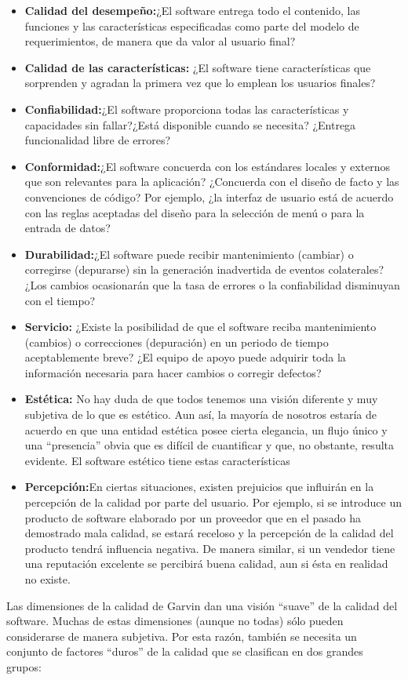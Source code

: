 \begin{itemize}
    \item  \textbf{Calidad del desempeño:}¿El software entrega todo el contenido, las funciones y las características especificadas como parte del modelo de requerimientos, de manera que da valor al usuario final?
    \item  \textbf{Calidad de las características:} ¿El software tiene características que sorprenden y agradan la primera vez que lo emplean los usuarios finales?
    \item  \textbf{Confiabilidad:}¿El software proporciona todas las características y capacidades sin fallar?¿Está disponible cuando se necesita? ¿Entrega funcionalidad libre de errores?
    \item  \textbf{Conformidad:}¿El software concuerda con los estándares locales y externos que son relevantes para la aplicación? ¿Concuerda con el diseño de facto y las convenciones de código? Por ejemplo, ¿la interfaz de usuario está de acuerdo con las reglas aceptadas del diseño para la selección de menú o para la entrada de datos?
    \item  \textbf{Durabilidad:}¿El software puede recibir mantenimiento (cambiar) o corregirse (depurarse) sin la generación inadvertida de eventos colaterales? ¿Los cambios ocasionarán que la tasa de errores o la confiabilidad disminuyan con el tiempo?
    \item  \textbf{Servicio:} ¿Existe la posibilidad de que el software reciba mantenimiento (cambios) o correcciones (depuración) en un periodo de tiempo aceptablemente breve? ¿El equipo de apoyo puede adquirir toda la información necesaria para hacer cambios o corregir defectos?
    \item  \textbf{Estética:} No hay duda de que todos tenemos una visión diferente y muy subjetiva de lo que es estético. Aun así, la mayoría de nosotros estaría de acuerdo en que una entidad estética posee cierta elegancia, un flujo único y una “presencia” obvia que es difícil de cuantificar y que, no obstante, resulta evidente. El software estético tiene estas características
    \item  \textbf{Percepción:}En ciertas situaciones, existen prejuicios que influirán en la percepción de la calidad por parte del usuario. Por ejemplo, si se introduce un producto de software elaborado por un proveedor que en el pasado ha demostrado mala calidad, se estará receloso y la percepción de la calidad del producto tendrá influencia negativa. De manera similar, si un vendedor tiene una reputación excelente se percibirá buena calidad, aun si ésta en realidad no existe.
\end{itemize}
Las dimensiones de la calidad de Garvin dan una visión “suave” de la calidad del software. Muchas de estas dimensiones (aunque no todas) sólo pueden considerarse de manera subjetiva. Por esta razón, también se necesita un conjunto de factores “duros” de la calidad que se clasifican en dos grandes grupos: \\

